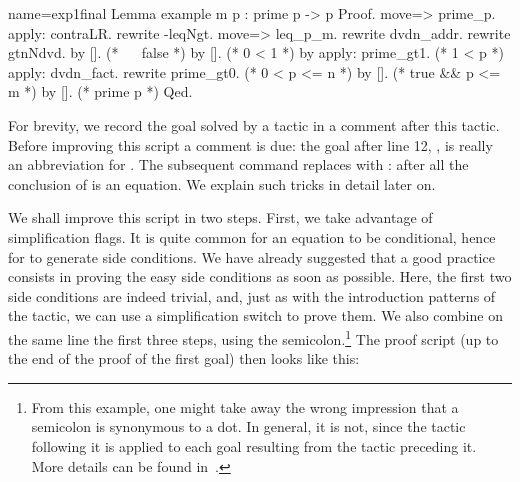 \begin{coq}{name=exp1final}{}
Lemma example m p : prime p -> p %
Proof.
move=> prime_p.
apply: contraLR.
rewrite -leqNgt.
move=> leq_p_m.
rewrite dvdn_addr.
  rewrite gtnNdvd.
    by [].  (* ~~ false *)
    by [].  (* 0 < 1 *)
  by apply: prime_gt1.  (* 1 < p *)
apply: dvdn_fact.
rewrite prime_gt0. (* 0 < p <= n *)
  by []. (* true && p <= m *)
by [].   (* prime p *)
Qed.
\end{coq}
For brevity, we record the goal solved by a tactic in a comment after
this tactic.  Before improving this script a comment is due:
the goal after line 12, , is really an abbreviation for
. The subsequent  command
replaces  with : after all the conclusion of
 is an equation.
We explain such tricks in detail later on.

We shall improve this script in two steps.  First, we take advantage of
 simplification flags.  It is quite common
for an equation to be conditional, hence for  to generate side
conditions.  We have already suggested that a good practice consists
in proving the easy side conditions
as soon as possible.  Here, the first two side conditions are indeed
trivial, and, just as with the introduction patterns of the  tactic,
we can use a simplification switch \C{//} to prove them.
We also combine on the same line the first three steps, using
the semicolon.\footnote{From this example, one might take away the
wrong impression that a semicolon is synonymous to a dot. In general,
it is not, since the tactic following it is applied to each goal resulting
from the tactic preceding it.
More details can be found in~\cite[section 5.4, ``The tactic language'']{Coq:manual}.}
The proof script (up to the end of the proof of the first
goal) then looks like this:

